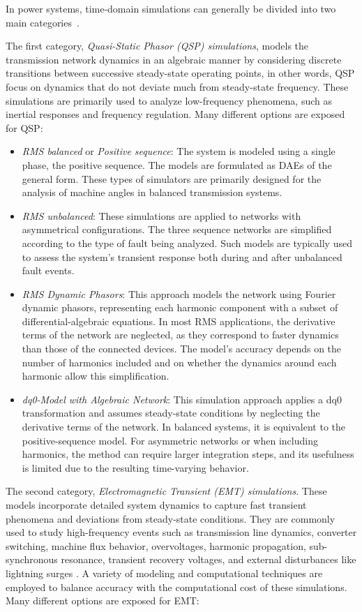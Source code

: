 In power systems, time-domain simulations can generally be divided into two main categories~\cite{LaraTDS}. 

The first category, \textit{Quasi-Static Phasor (QSP) simulations}, models the transmission network dynamics in an algebraic manner by considering discrete transitions
between successive steady-state operating points, in other words, QSP focus on dynamics that do not deviate much from steady-state frequency.
These simulations are primarily used to analyze low-frequency phenomena, such as inertial responses and frequency regulation. 
Many different options are exposed for QSP:

\begin{itemize}
    \item \textit{RMS balanced} or \textit{Positive sequence}: The system is modeled using a single phase, the positive sequence. The models are formulated as DAEs of the general form.
     These types of simulators are primarily designed for the analysis of machine angles in balanced transmission systems. 
    \item \textit{RMS unbalanced}: These simulations are applied to networks with asymmetrical configurations. The three sequence networks are simplified according to the type 
    of fault being analyzed. Such models are typically used to assess the system's transient response both during and after unbalanced fault events.
    \item \textit{RMS Dynamic Phasors}: This approach models the network using Fourier dynamic phasors, representing each harmonic component with a subset of differential-algebraic equations. 
    In most RMS applications, the derivative terms of the network are neglected, as they correspond to faster dynamics than those of the connected devices. 
    The model's accuracy depends on the number of harmonics included and on whether the dynamics around each harmonic allow this simplification.
    \item \textit{dq0-Model with Algebraic Network}: This simulation approach applies a dq0 transformation and assumes steady-state conditions by neglecting the derivative terms
     of the network. In balanced systems, it is equivalent to the positive-sequence model. For asymmetric networks or when including harmonics, the method can require larger
     integration steps, and its usefulness is limited due to the resulting time-varying behavior.
\end{itemize}


The second category, \textit{Electromagnetic Transient (EMT) simulations}. These models incorporate detailed system dynamics to capture fast transient phenomena and deviations 
from steady-state conditions. They are commonly used to study high-frequency events such as transmission line dynamics, converter switching, machine flux behavior, 
overvoltages, harmonic propagation, sub-synchronous resonance, transient recovery voltages, and external disturbances like lightning surges \cite{Dommel_EMTP_Theory_Book_1986}. 
A variety of modeling and computational techniques are employed to balance accuracy with the computational cost of these simulations.
Many different options are exposed for EMT:

